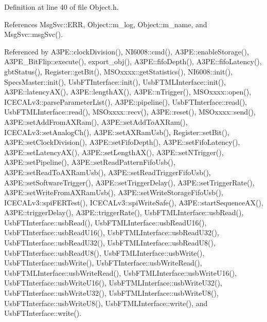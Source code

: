 Definition at line 40 of file Object.\+h.



References Msg\+Svc\+::\+E\+RR, Object\+::m\+\_\+log, Object\+::m\+\_\+name, and Msg\+Svc\+::msg\+Svc().



Referenced by A3\+P\+E\+::clock\+Division(), N\+I6008\+::cmd(), A3\+P\+E\+::enable\+Storage(), A3\+P\+E\+\_\+\+Bit\+Flip\+::execute(), export\+\_\+obj(), A3\+P\+E\+::fifo\+Depth(), A3\+P\+E\+::fifo\+Latency(), gbt\+Status(), Register\+::get\+Bit(), M\+S\+Oxxxx\+::get\+Statistics(), N\+I6008\+::init(), Specs\+Master\+::init(), Usb\+F\+T\+Interface\+::init(), Usb\+F\+T\+M\+L\+Interface\+::init(), A3\+P\+E\+::latency\+A\+X(), A3\+P\+E\+::length\+A\+X(), A3\+P\+E\+::n\+Trigger(), M\+S\+Oxxxx\+::open(), I\+C\+E\+C\+A\+Lv3\+::parse\+Parameter\+List(), A3\+P\+E\+::pipeline(), Usb\+F\+T\+Interface\+::read(), Usb\+F\+T\+M\+L\+Interface\+::read(), M\+S\+Oxxxx\+::recv(), A3\+P\+E\+::reset(), M\+S\+Oxxxx\+::send(), A3\+P\+E\+::set\+Add\+From\+A\+X\+Ram(), A3\+P\+E\+::set\+Add\+To\+A\+X\+Ram(), I\+C\+E\+C\+A\+Lv3\+::set\+Analog\+Ch(), A3\+P\+E\+::set\+A\+X\+Ram\+Usb(), Register\+::set\+Bit(), A3\+P\+E\+::set\+Clock\+Division(), A3\+P\+E\+::set\+Fifo\+Depth(), A3\+P\+E\+::set\+Fifo\+Latency(), A3\+P\+E\+::set\+Latency\+A\+X(), A3\+P\+E\+::set\+Length\+A\+X(), A3\+P\+E\+::set\+N\+Trigger(), A3\+P\+E\+::set\+Pipeline(), A3\+P\+E\+::set\+Read\+Pattern\+Fifo\+Usb(), A3\+P\+E\+::set\+Read\+To\+A\+X\+Ram\+Usb(), A3\+P\+E\+::set\+Read\+Trigger\+Fifo\+Usb(), A3\+P\+E\+::set\+Software\+Trigger(), A3\+P\+E\+::set\+Trigger\+Delay(), A3\+P\+E\+::set\+Trigger\+Rate(), A3\+P\+E\+::set\+Write\+From\+A\+X\+Ram\+Usb(), A3\+P\+E\+::set\+Write\+Storage\+Fifo\+Usb(), I\+C\+E\+C\+A\+Lv3\+::spi\+F\+E\+R\+Test(), I\+C\+E\+C\+A\+Lv3\+::spi\+Write\+Safe(), A3\+P\+E\+::start\+Sequence\+A\+X(), A3\+P\+E\+::trigger\+Delay(), A3\+P\+E\+::trigger\+Rate(), Usb\+F\+T\+M\+L\+Interface\+::usb\+Read(), Usb\+F\+T\+Interface\+::usb\+Read(), Usb\+F\+T\+M\+L\+Interface\+::usb\+Read\+U16(), Usb\+F\+T\+Interface\+::usb\+Read\+U16(), Usb\+F\+T\+M\+L\+Interface\+::usb\+Read\+U32(), Usb\+F\+T\+Interface\+::usb\+Read\+U32(), Usb\+F\+T\+M\+L\+Interface\+::usb\+Read\+U8(), Usb\+F\+T\+Interface\+::usb\+Read\+U8(), Usb\+F\+T\+M\+L\+Interface\+::usb\+Write(), Usb\+F\+T\+Interface\+::usb\+Write(), Usb\+F\+T\+Interface\+::usb\+Write\+Read(), Usb\+F\+T\+M\+L\+Interface\+::usb\+Write\+Read(), Usb\+F\+T\+M\+L\+Interface\+::usb\+Write\+U16(), Usb\+F\+T\+Interface\+::usb\+Write\+U16(), Usb\+F\+T\+M\+L\+Interface\+::usb\+Write\+U32(), Usb\+F\+T\+Interface\+::usb\+Write\+U32(), Usb\+F\+T\+M\+L\+Interface\+::usb\+Write\+U8(), Usb\+F\+T\+Interface\+::usb\+Write\+U8(), Usb\+F\+T\+M\+L\+Interface\+::write(), and Usb\+F\+T\+Interface\+::write().



